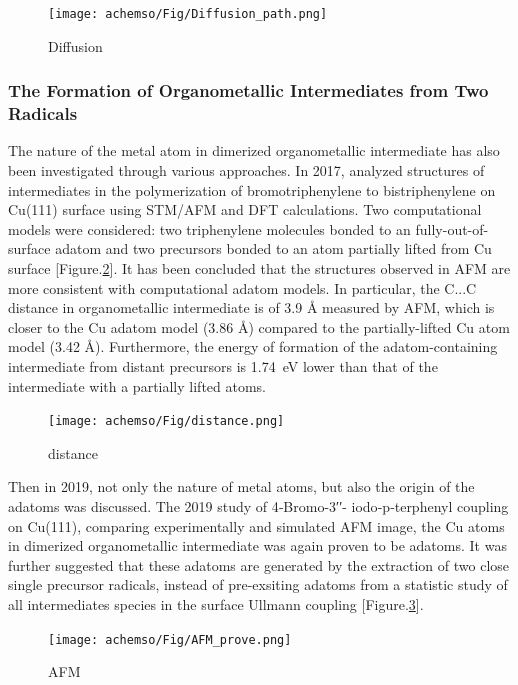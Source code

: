 \documentclass[journal=jacsat,manuscript=article]{achemso}
\begin{document}
\begin{figure}[ht]
\centering
\texttt{[image: achemso/Fig/Diffusion\_path.png]}
\caption{Diffusion}
\label{fig:diff}
\end{figure}


\subsubsection{The Formation of Organometallic Intermediates from Two Radicals}
The nature of the metal atom in dimerized organometallic intermediate has also been investigated through various approaches. In 2017, \citeauthor{acsnano2017}\cite{acsnano2017} analyzed structures of intermediates in the polymerization of bromotriphenylene to bistriphenylene on Cu(111) surface using STM/AFM and DFT calculations. Two computational models were considered: two triphenylene molecules bonded to an fully-out-of-surface adatom and two precursors bonded to an atom partially lifted from Cu surface [Figure.\ref{fig:5}]. It has been concluded that the structures observed in AFM are more consistent with computational adatom models. In particular, the C...C distance in organometallic intermediate is of 3.9 \si{\angstrom} measured by AFM, which is closer to the Cu adatom model (3.86 \si{\angstrom}) compared to the partially-lifted Cu atom model (3.42 \si{\angstrom}). Furthermore, the energy of formation of the adatom-containing intermediate from distant precursors is 1.74~eV lower than that of the intermediate with a partially lifted atoms. 


\begin{figure}[ht]
\centering
\texttt{[image: achemso/Fig/distance.png]}
\caption{distance}
\label{fig:5}
\end{figure}


Then in 2019, not only the nature of metal atoms, but also the origin of the adatoms was discussed. The 2019 study of 4‐Bromo-3′′- iodo‐p‐terphenyl coupling on Cu(111), comparing experimentally and simulated AFM image, the Cu atoms in dimerized organometallic intermediate was again proven to be adatoms\cite{acsnano2019}. It was further suggested that these adatoms are generated by the extraction of two close single precursor radicals, instead of pre-exsiting adatoms from a statistic study of all intermediates species in the surface Ullmann coupling [Figure.\ref{fig:6}].
\begin{figure}[ht]
\centering
\texttt{[image: achemso/Fig/AFM\_prove.png]}
\caption{AFM}
\label{fig:6}
\end{figure}
\end{document}
